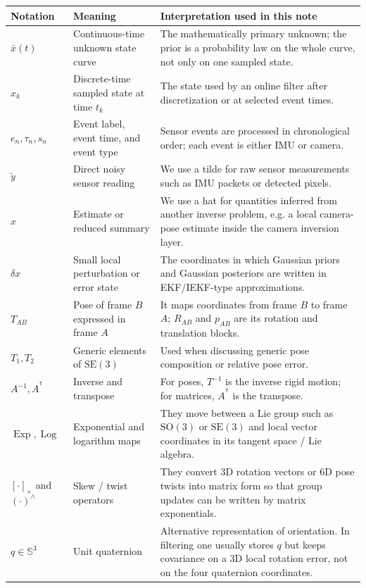\documentclass[11pt]{report}
\newcommand{\SO}{\mathrm{SO}(3)}
\newcommand{\SE}{\mathrm{SE}(3)}
\newcommand{\Sthree}{\mathbb{S}^3}
\newcommand{\Exp}{\operatorname{Exp}}
\newcommand{\Log}{\operatorname{Log}}
\newcommand{\tran}{^{\mathsf T}}
\begin{document}
\begin{table}[t]
\centering
\scriptsize
\setlength{\tabcolsep}{3.0pt}
\begin{tabularx}{\textwidth}{p{}p{}X}
\toprule
\textbf{Notation} & \textbf{Meaning} & \textbf{Interpretation used in this note}\\
\midrule
$\bar x(t)$ & Continuous-time unknown state curve & The mathematically primary unknown; the prior is a probability law on the whole curve, not only on one sampled state.\\
$x_k$ & Discrete-time sampled state at time $t_k$ & The state used by an online filter after discretization or at selected event times.\\
$e_n,\tau_n,s_n$ & Event label, event time, and event type & Sensor events are processed in chronological order; each event is either IMU or camera.\\
$\widetilde y$ & Direct noisy sensor reading & We use a tilde for raw sensor measurements such as IMU packets or detected pixels.\\
$\widehat x$ & Estimate or reduced summary & We use a hat for quantities inferred from another inverse problem, e.g. a local camera-pose estimate inside the camera inversion layer.\\
$\delta x$ & Small local perturbation or error state & The coordinates in which Gaussian priors and Gaussian posteriors are written in EKF/IEKF-type approximations.\\
$T_{AB}$ & Pose of frame $B$ expressed in frame $A$ & It maps coordinates from frame $B$ to frame $A$; $R_{AB}$ and $p_{AB}$ are its rotation and translation blocks.\\
$T_1,T_2$ & Generic elements of $\SE$ & Used when discussing generic pose composition or relative pose error.\\
$A^{-1},A^{\tran}$ & Inverse and transpose & For poses, $T^{-1}$ is the inverse rigid motion; for matrices, $A^{\tran}$ is the transpose.\\
$\Exp,\Log$ & Exponential and logarithm maps & They move between a Lie group such as $\SO$ or $\SE$ and local vector coordinates in its tangent space / Lie algebra.\\
$[\cdot]_{\times}$ and $(\cdot)^\wedge$ & Skew / twist operators & They convert 3D rotation vectors or 6D pose twists into matrix form so that group updates can be written by matrix exponentials.\\
$q\in\Sthree$ & Unit quaternion & Alternative representation of orientation. In filtering one usually stores $q$ but keeps covariance on a 3D local rotation error, not on the four quaternion coordinates.\\

\end{tabularx}
\end{table}
\end{document}
